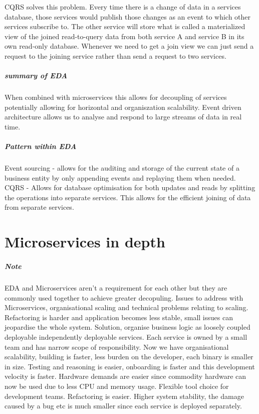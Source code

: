 \documentclass[a4paper, 11pt]{book}
\begin{document}
    CQRS solves this problem.
    Every time there is a change of data in a services database, those services would publish those changes as an event to which other services subscribe to.
    The other service will store what is called a materialized view of the joined read-to-query data from both service A and service B in its own read-only database.
    Whenever we need to get a join view we can just send a request to the joining service rather than send a request to two services.

    \paragraph{summary of EDA}
    When combined with microservices this allows for decoupling of services potentially allowing for horizontal and organiszation scalability.
    Event driven architecture allows us to analyse and respond to large streams of data in real time.

    \paragraph{Pattern within EDA}
    Event sourcing - allows for the auditing and storage of the current state of a business entity by only appending events and replaying them when needed.
    CQRS - Allows for database optimisation for both updates and reads by splitting the operations into separate services.
    This allows for the efficient joining of data from separate services.

    


    \chapter{Microservices in depth}

    \paragraph{Note} EDA and Microservices aren't a requirement for each other but they are commonly used together to achieve greater decopuling.
    Issues to address with Microservices, organisational scaling and technical problems relating to scaling.
    Refactoring is harder and application becomes less stable, small issues can jeopardise the whole system.
    Solution, organise business logic as loosely coupled deployable independently deployable services.
    Each service is owned by a small team and has narrow scope of responsibility.
    Now we have organisational scalability, building is faster, less burden on the developer, each binary is smaller in size.
    Testing and reasoning is easier, onboarding is faster and this development velocity is faster.
    Hardware demands are easier since commodity hardware can now be used due to less CPU and memory usage.
    Flexible tool choice for development teams.
    Refactoring is easier.
    Higher system stability, the damage caused by a bug etc is much smaller since each service is deployed separately.
\end{document}
